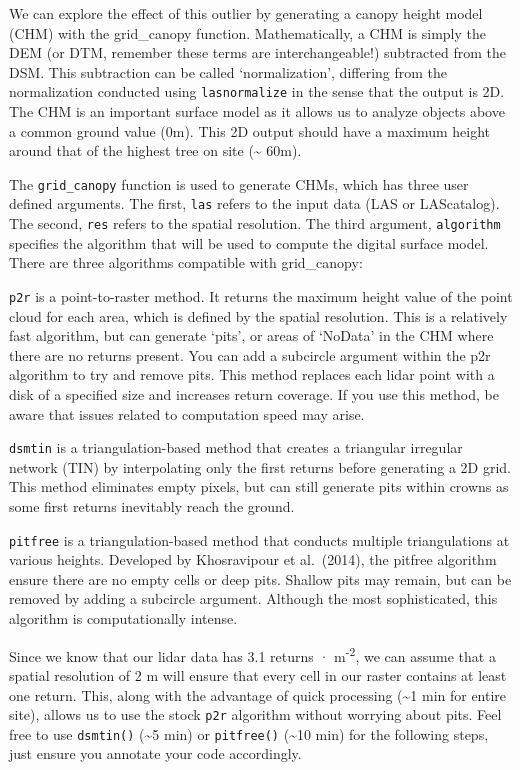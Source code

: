 \documentclass[
]{book}
\begin{document}
We can explore the effect of this outlier by generating a canopy height model (CHM) with the grid\_canopy function. Mathematically, a CHM is simply the DEM (or DTM, remember these terms are interchangeable!) subtracted from the DSM. This subtraction can be called `normalization', differing from the normalization conducted using \texttt{lasnormalize} in the sense that the output is 2D. The CHM is an important surface model as it allows us to analyze objects above a common ground value (0m). This 2D output should have a maximum height around that of the highest tree on site (\textasciitilde{} 60m).

The \texttt{grid\_canopy} function is used to generate CHMs, which has three user defined arguments. The first, \texttt{las} refers to the input data (LAS or LAScatalog). The second, \texttt{res} refers to the spatial resolution. The third argument, \texttt{algorithm} specifies the algorithm that will be used to compute the digital surface model. There are three algorithms compatible with grid\_canopy:

\texttt{p2r} is a point-to-raster method. It returns the maximum height value of the point cloud for each area, which is defined by the spatial resolution. This is a relatively fast algorithm, but can generate `pits', or areas of `NoData' in the CHM where there are no returns present. You can add a subcircle argument within the p2r algorithm to try and remove pits. This method replaces each lidar point with a disk of a specified size and increases return coverage. If you use this method, be aware that issues related to computation speed may arise.

\texttt{dsmtin} is a triangulation-based method that creates a triangular irregular network (TIN) by interpolating only the first returns before generating a 2D grid. This method eliminates empty pixels, but can still generate pits within crowns as some first returns inevitably reach the ground.

\texttt{pitfree} is a triangulation-based method that conducts multiple triangulations at various heights. Developed by Khosravipour et al.~(2014), the pitfree algorithm ensure there are no empty cells or deep pits. Shallow pits may remain, but can be removed by adding a subcircle argument. Although the most sophisticated, this algorithm is computationally intense.

Since we know that our lidar data has 3.1 returns · m\textsuperscript{-2}, we can assume that a spatial resolution of 2 m will ensure that every cell in our raster contains at least one return. This, along with the advantage of quick processing (\textasciitilde1 min for entire site), allows us to use the stock \texttt{p2r} algorithm without worrying about pits. Feel free to use \texttt{dsmtin()} (\textasciitilde5 min) or \texttt{pitfree()} (\textasciitilde10 min) for the following steps, just ensure you annotate your code accordingly.
\end{document}
